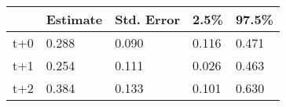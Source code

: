 \begin{tabular}{lllll}
  \toprule
  & Estimate & Std. Error & 2.5\% & 97.5\% \\ 
  \midrule
t+0 & 0.288 & 0.090 & 0.116 & 0.471 \\ 
  t+1 & 0.254 & 0.111 & 0.026 & 0.463 \\ 
  t+2 & 0.384 & 0.133 & 0.101 & 0.630 \\ 
   \bottomrule
\end{tabular}
